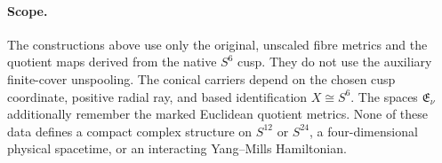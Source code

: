 \paragraph{Scope.}
The constructions above use only the original, unscaled fibre metrics and
the quotient maps derived from the native \(S^6\) cusp.  They do not use the
auxiliary finite-cover unspooling.  The conical carriers depend on the
chosen cusp coordinate, positive radial ray, and based identification
\(X\cong S^6\).  The spaces \(\mathfrak E_\nu\) additionally remember the
marked Euclidean quotient metrics.  None of these data defines a compact
complex structure on \(S^{12}\) or \(S^{24}\), a four-dimensional physical
spacetime, or an interacting Yang--Mills Hamiltonian.
